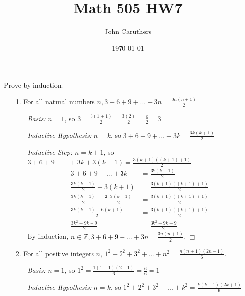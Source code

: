 \documentclass{article}
\title{Math 505 HW7}
\author{John Caruthers}
\date\today
\begin{document}
\maketitle

Prove by induction.
\begin{itemize}
    \item[1.] For all natural numbers $n, 3+6+9+...+3n=\frac{3n(n+1)}{2}$
    \begin{itemize}
        \item[]\emph{Basis:} $n=1$, so $3=\frac{3(1+1)}{2}=\frac{3(2)}{2}=\frac{6}{2}=3$
        
        \item[]\emph{Inductive Hypothesis:} $n=k$, so $3+6+9+...+3k=\frac{3k(k+1)}{2}$
        
        \item[]\emph{Inductive Step:} $n=k+1$, so $3+6+9+...+3k+3(k+1)=\frac{3(k+1)((k+1)+1)}{2}$
        \begin{align}
            3+6+9+...+3k&=\frac{3k(k+1)}{2}\nonumber\\
            \frac{3k(k+1)}{2}+3(k+1)&=\frac{3(k+1)((k+1)+1)}{2}\nonumber\\
            \frac{3k(k+1)}{2}+\frac{2\cdot3(k+1)}{2}&=\frac{3(k+1)((k+1)+1)}{2}\nonumber\\
            \frac{3k(k+1)+6(k+1)}{2}&=\frac{3(k+1)((k+1)+1)}{2}\nonumber\\
            \frac{3k^2+9k+9}{2}&=\frac{3k^2+9k+9}{2}\nonumber
        \end{align}
        By induction, $n\in \mathbb{Z},3+6+9+...+3n=\frac{3n(n+1)}{2}$. $\Box$
    \end{itemize}
    
    \item[2.] For all positive integers $n$, $1^2+2^2+3^2+...+n^2=\frac{n(n+1)(2n+1)}{6}$.
    \begin{itemize}
        \item[]\emph{Basis:} $n=1$, so $1^2=\frac{1(1+1)(2+1)}{6}=\frac{6}{6}=1$
        
        \item[]\emph{Inductive Hypothesis:} $n=k$, so $1^2+2^2+3^2+...+k^2=\frac{k(k+1)(2k+1)}{6}$
        

\end{itemize}
\end{itemize}
\end{document}

